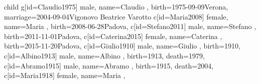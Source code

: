\documentclass{article}
\begin{document}
\begin{midpage}
\begin{center}
\begin{genealogypicture}
{{{{{{{{{{{                                        }
                                        child{
                                            g[id=Claudio1975]{
                                                male,
                                                name={Claudio },
                                                birth={1975-09-09}{Verona},
                                                marriage={2004-09-04}{Vigonovo \newline Beatrice Varotto}
                                            }
                                            c[id=Maria2008]{
                                                female,
                                                name={Maria },
                                                birth={2008-06-28}{Padova},
                                            }
                                            c[id=Stefano2011]{
                                                male,
                                                name={Stefano },
                                                birth={2011-11-01}{Padova},
                                            }
                                            c[id=Caterina2015]{
                                                female,
                                                name={Caterina },
                                                birth={2015-11-20}{Padova},
                                            }
                                        }
                                    }
                                }
                                c[id=Giulio1910]{
                                    male,
                                    name={Giulio },
                                    birth={1910}{},
                                }
                                c[id=Albino1913]{
                                    male,
                                    name={Albino },
                                    birth={1913}{},
                                    death={1979}{},
                                }
                                c[id=Abramo1915]{
                                    male,
                                    name={Abramo },
                                    birth={1915}{},
                                    death={2004}{},
                                }
                                c[id=Maria1918]{
                                    female,
                                    name={Maria },
}}}}}}}}}
\end{genealogypicture}
\end{center}
\end{midpage}
\end{document}
